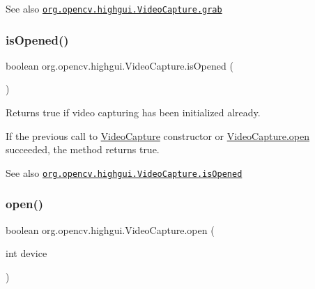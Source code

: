 \begin{DoxySeeAlso}{See also}
\href{http://docs.opencv.org/modules/highgui/doc/reading_and_writing_images_and_video.html#videocapture-grab}{\tt org.\+opencv.\+highgui.\+Video\+Capture.\+grab} 
\end{DoxySeeAlso}
\mbox{\label{classorg_1_1opencv_1_1highgui_1_1_video_capture_a9bb9204765ebe45c6958adad5aaa1319}} 
\subsubsection{\texorpdfstring{is\+Opened()}{isOpened()}}
{\footnotesize\ttfamily boolean org.\+opencv.\+highgui.\+Video\+Capture.\+is\+Opened (\begin{DoxyParamCaption}{ }\end{DoxyParamCaption})}

Returns true if video capturing has been initialized already.

If the previous call to {\ttfamily \mbox{\hyperlink{classorg_1_1opencv_1_1highgui_1_1_video_capture}{Video\+Capture}}} constructor or {\ttfamily \mbox{\hyperlink{classorg_1_1opencv_1_1highgui_1_1_video_capture_ae7887d274bcced3330caa11478da608a}{Video\+Capture.\+open}}} succeeded, the method returns true.

\begin{DoxySeeAlso}{See also}
\href{http://docs.opencv.org/modules/highgui/doc/reading_and_writing_images_and_video.html#videocapture-isopened}{\tt org.\+opencv.\+highgui.\+Video\+Capture.\+is\+Opened} 
\end{DoxySeeAlso}
\mbox{\label{classorg_1_1opencv_1_1highgui_1_1_video_capture_ae7887d274bcced3330caa11478da608a}} 
\subsubsection{\texorpdfstring{open()}{open()}}
{\footnotesize\ttfamily boolean org.\+opencv.\+highgui.\+Video\+Capture.\+open (\begin{DoxyParamCaption}\item[{int}]{device }\end{DoxyParamCaption})}

